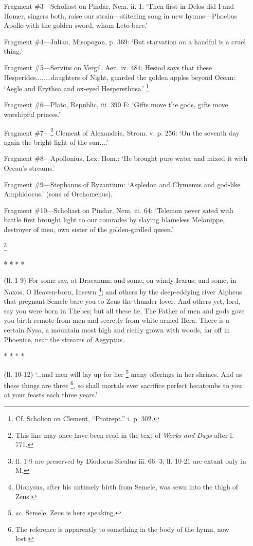 Fragment \#3—Scholiast on Pindar, Nem. ii. 1: ‘Then first in Delos
did I and Homer, singers both, raise our strain—stitching song in new
hymns—Phoebus Apollo with the golden sword, whom Leto bare.’

Fragment \#4—Julian, Misopogon, p. 369: ‘But starvation on a handful
is a cruel thing.’

Fragment \#5—Servius on Vergil, Aen. iv. 484: Hesiod says that these
Hesperides........daughters of Night, guarded the golden apples beyond Ocean:
‘Aegle and Erythea and ox-eyed Hesperethusa.’ \footnote{Cf. Scholion on Clement,
“Protrept.” i. p. 302.}

Fragment \#6—Plato, Republic, iii. 390 E: ‘Gifts move the gods,
gifts move worshipful princes.’

Fragment \#7—\footnote{This line may once have
been read in the text of \emph{Works and Days} after l. 771.} Clement of Alexandria, Strom. v.
p. 256: ‘On the seventh day again the bright light of the sun....’

Fragment \#8—Apollonius, Lex. Hom.: ‘He brought pure water and mixed
it with Ocean’s streams.’

Fragment \#9—Stephanus of Byzantium: ‘Aspledon and Clymenus and
god-like Amphidocus.’ (sons of Orchomenus).

Fragment \#10—Scholiast on Pindar, Nem. iii. 64: ‘Telemon never
sated with battle first brought light to our comrades by slaying blameless
Melanippe, destroyer of men, own sister of the golden-girdled queen.’



\footnote{ll. 1-9 are preserved by
Diodorus Siculus iii. 66. 3; ll. 10-21 are extant only in M.}

* * * *

(ll. 1-9) For some say, at Dracanum; and some, on windy Icarus; and some, in
Naxos, O Heaven-born, Insewn \footnote{Dionysus, after his
untimely birth from Semele, was sewn into the thigh of Zeus.}; and others by the deep-eddying
river Alpheus that pregnant Semele bare you to Zeus the thunder-lover. And
others yet, lord, say you were born in Thebes; but all these lie. The Father of
men and gods gave you birth remote from men and secretly from white-armed Hera.
There is a certain Nysa, a mountain most high and richly grown with woods, far
off in Phoenice, near the streams of Aegyptus.

* * * *

(ll. 10-12) ‘...and men will lay up for her \footnote{\emph{sc}. Semele. Zeus is
here speaking.} many
offerings in her shrines. And as these things are three \footnote{The reference is
apparently to something in the body of the hymn, now lost.}, so shall mortals ever sacrifice
perfect hecatombs to you at your feasts each three years.’

